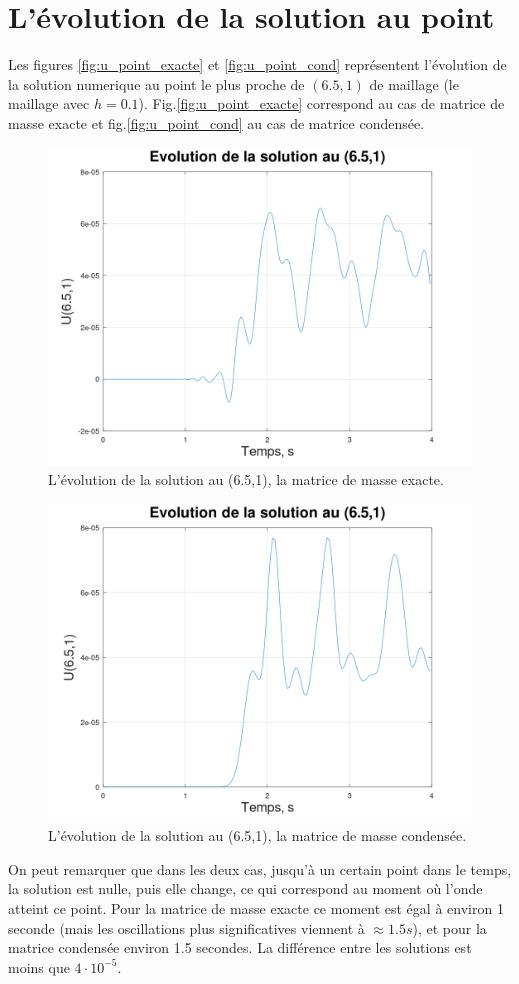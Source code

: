 \documentclass[12pt]{article}
\begin{document}
\section{L'évolution de la solution au point}
Les figures \eqref{fig:u_point_exacte} et \eqref{fig:u_point_cond} représentent l'évolution de la solution numerique au point le plus proche de $(6.5,1)$ de maillage (le maillage avec $h=0.1$). Fig.\eqref{fig:u_point_exacte} correspond au cas de matrice de masse exacte et fig.\eqref{fig:u_point_cond} au cas de matrice condensée.
\begin{figure}[H]
	\centering
	\includegraphics[height=0.4\linewidth]{images/u_6,5,1}
	\caption{L'évolution de la solution au (6.5,1), la matrice de masse exacte.}
	\label{fig:u_point_exacte}
\end{figure}
\begin{figure}[H]
	\centering
	\includegraphics[height=0.4\linewidth]{images/u_6,5,1_condense}
	\caption{L'évolution de la solution au (6.5,1), la matrice de masse condensée.}
	\label{fig:u_point_cond}
\end{figure}
On peut remarquer que dans les deux cas, jusqu'à un certain point dans le temps, la solution est nulle, puis elle change, ce qui correspond au moment où l'onde atteint ce point. Pour la matrice de masse exacte ce moment est égal à environ 1 seconde (mais les oscillations plus significatives viennent à $\approx 1.5 s$), et pour la matrice condensée environ 1.5 secondes. La différence entre les solutions est moins que $4\cdot10^{-5}$. 
\end{document}
